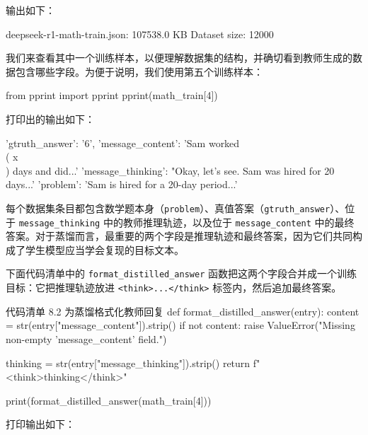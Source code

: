 输出如下：

\begin{codebox}
deepseek-r1-math-train.json: 107538.0 KB
Dataset size: 12000
\end{codebox}

我们来查看其中一个训练样本，以便理解数据集的结构，并确切看到教师生成的数据包含哪些字段。为便于说明，我们使用第五个训练样本：

\begin{codebox}
from pprint import pprint
pprint(math_train[4])
\end{codebox}

打印出的输出如下：

\begin{codebox}
{'gtruth_answer': '6',
 'message_content': 'Sam worked \\( x \\) days and did...'
 'message_thinking': "Okay, let's see. Sam was hired for 20 days...'
 'problem': 'Sam is hired for a 20-day period...'
}
\end{codebox}

每个数据集条目都包含数学题本身（\texttt{problem}）、真值答案（\texttt{gtruth\_answer}）、位于 \texttt{message\_thinking} 中的教师推理轨迹，以及位于 \texttt{message\_content} 中的最终答案。对于蒸馏而言，最重要的两个字段是推理轨迹和最终答案，因为它们共同构成了学生模型应当学会复现的目标文本。

下面代码清单中的 \texttt{format\_distilled\_answer} 函数把这两个字段合并成一个训练目标：它把推理轨迹放进 \texttt{\textless{}think\textgreater{}...\textless{}/think\textgreater{}} 标签内，然后追加最终答案。

\begin{codeboxt}{代码清单 8.2 为蒸馏格式化教师回复}
def format_distilled_answer(entry):
    content = str(entry["message_content"]).strip()
    if not content:
        raise ValueError("Missing non-empty 'message_content' field.")

    thinking = str(entry["message_thinking"]).strip()
    return f"<think>{thinking}</think>\n{}"

print(format_distilled_answer(math_train[4]))
\end{codeboxt}

打印输出如下：


